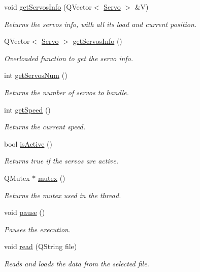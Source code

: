 \begin{DoxyCompactItemize}
void \hyperlink{a00009_a5fd8ef13314428f5ba7646730cc58f1c}{get\+Servos\+Info} (Q\+Vector$<$ \hyperlink{a00007}{Servo} $>$ \&V)
\begin{DoxyCompactList}\small\item\em Returns the servos info, with all its load and current position. \end{DoxyCompactList}\item 
Q\+Vector$<$ \hyperlink{a00007}{Servo} $>$ \hyperlink{a00009_a3d58189cdeddfb828856f192607f68d2}{get\+Servos\+Info} ()
\begin{DoxyCompactList}\small\item\em Overloaded function to get the servo info. \end{DoxyCompactList}\item 
int \hyperlink{a00009_ad6ead0ac6fce4539d4b0ff5a3e18ac38}{get\+Servos\+Num} ()
\begin{DoxyCompactList}\small\item\em Returns the number of servos to handle. \end{DoxyCompactList}\item 
int \hyperlink{a00009_a6af364effc9c52c0acec7d00a2c3d262}{get\+Speed} ()
\begin{DoxyCompactList}\small\item\em Returns the current speed. \end{DoxyCompactList}\item 
bool \hyperlink{a00009_ae520ccab8a81bf7df0a6a8ad3b7fbaae}{is\+Active} ()
\begin{DoxyCompactList}\small\item\em Returns true if the servos are active. \end{DoxyCompactList}\item 
Q\+Mutex $\ast$ \hyperlink{a00009_a82d074ab2c445470a6f49e2935bf6a8e}{mutex} ()
\begin{DoxyCompactList}\small\item\em Returns the mutex used in the thread. \end{DoxyCompactList}\item 
void \hyperlink{a00009_ae0d4a59954aafbe8cd85f9326e4fcdd0}{pause} ()
\begin{DoxyCompactList}\small\item\em Pauses the execution. \end{DoxyCompactList}\item 
void \hyperlink{a00009_aaa60ec35320c1c3de691f3a00cd638cb}{read} (Q\+String file)
\begin{DoxyCompactList}\small\item\em Reads and loads the data from the selected file. \end{DoxyCompactList}\item 

\end{DoxyCompactItemize}
